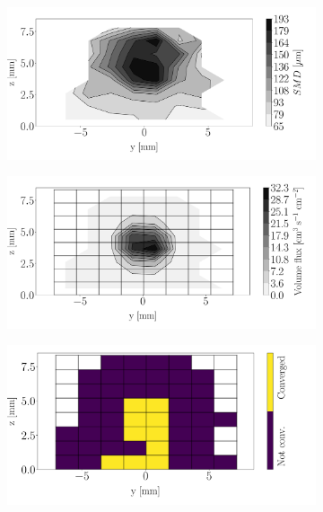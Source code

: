 
\begin{figure}[h!]
\centering
\begin{subfigure}[b]{0.3\textwidth}
	\centering
   \includegraphics[scale=\scaleSLIJICF]{./part2_developments/figures_ch5_resolved_JICF/injectors_SLI/uG100_dx20_x10_NT_SMD_map}
\end{subfigure}
   \hspace{0.17in}
\begin{subfigure}[b]{0.3\textwidth}
	\centering
   \includegraphics[scale=\scaleSLIJICF]{./part2_developments/figures_ch5_resolved_JICF/injectors_SLI/uG100_dx20_x10_NT_volume_flux_map}
\end{subfigure}
   \hspace{0.17in}
\begin{subfigure}[b]{0.3\textwidth}
	\centering
   \includegraphics[scale=\scaleSLIJICF]{./part2_developments/figures_ch5_resolved_JICF/injectors_SLI/uG100_dx20_x10_NT_convergence_map}
\end{subfigure}


\end{figure}
